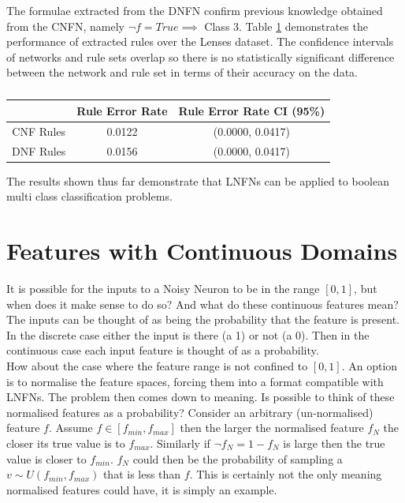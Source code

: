 The formulae extracted from the DNFN confirm previous knowledge obtained from the CNFN, namely $\lnot f = True \implies $ Class 3. Table \ref{tab:lenses-rule-peformance-comp} demonstrates the performance of extracted rules over the Lenses dataset. The confidence intervals of networks and rule sets overlap so there is no statistically significant difference between the network and rule set in terms of their accuracy on the data.

\begin{table}[H]
	\begin{center}
		\begin{tabular}{| c | c | c |}
			\hline
			& Rule Error Rate & Rule Error Rate CI (95\%) \\
			\hline
			\hline
			CNF Rules & 0.0122 & (0.0000, 0.0417) \\
			\hline
			DNF Rules & 0.0156 & (0.0000, 0.0417) \\
			\hline
		\end{tabular}
	\end{center}
	\caption{}
	\label{tab:lenses-rule-peformance-comp}
\end{table}

The results shown thus far demonstrate that LNFNs can be applied to boolean multi class classification problems.

\section{Features with Continuous Domains}
It is possible for the inputs to a Noisy Neuron to be in the range $[0,1]$, but when does it make sense to do so? And what do these continuous features mean? The inputs can be thought of as being the probability that the feature is present. In the discrete case either the input is there (a 1) or not (a 0). Then in the continuous case each input feature is thought of as a probability.\\

How about the case where the feature range is not confined to $[0,1]$. An option is to normalise the feature spaces, forcing them into a format compatible with LNFNs. The problem then comes down to meaning. Is possible to think of these normalised features as a probability? Consider an arbitrary (un-normalised) feature $f$. Assume $f \in [f_{min}, f_{max}]$ then the larger the normalised feature $f_N$ the closer its true value is to $f_{max}$. Similarly if $\lnot f_N = 1 - f_N$ is large then the true value is closer to $f_{min}$. $f_N$ could then be the probability of sampling a $v \sim U(f_{min}, f_{max})$ that is less than $f$. This is certainly not the only meaning normalised features could have, it is simply an example.\\


